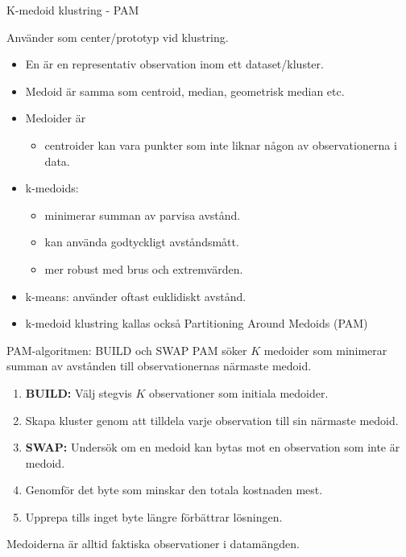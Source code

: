 \documentclass[10pt,english]{beamer}
\begin{document}
\begin{frame}{K-medoid klustring - PAM}

    Använder  som center/prototyp vid klustring.
    \begin{itemize}
        \item En  är en representativ observation inom ett dataset/kluster.
        \item Medoid är  samma som centroid, median, geometrisk median etc.
        \item Medoider är 
        \begin{itemize}
            \item centroider kan vara punkter som inte liknar någon av observationerna i data.
        \end{itemize}
        \item k-medoids:
        \begin{itemize}
            \item minimerar summan av parvisa avstånd.
            \item kan använda godtyckligt avståndsmått.
            \item mer robust med brus och extremvärden.
        \end{itemize}
        \item k-means: använder oftast euklidiskt avstånd.
        \item k-medoid klustring kallas också Partitioning Around Medoids (PAM)
    \end{itemize}
    
\end{frame}

\begin{frame}{PAM-algoritmen: BUILD och SWAP}
    PAM söker $K$ medoider som minimerar summan av avstånden
    till observationernas närmaste medoid.

    \begin{enumerate}
        \item \textbf{BUILD:} Välj stegvis $K$ observationer som
              initiala medoider.

        \item Skapa kluster genom att tilldela varje observation till sin närmaste medoid.

        \item \textbf{SWAP:} Undersök om en medoid kan bytas mot
              en observation som inte är medoid.

        \item Genomför det byte som minskar den totala kostnaden mest.

        \item Upprepa tills inget byte längre förbättrar lösningen.
    \end{enumerate}

    \begin{greenbox}
        Medoiderna är alltid faktiska observationer i datamängden.
    \end{greenbox}
\end{frame}
\end{document}
